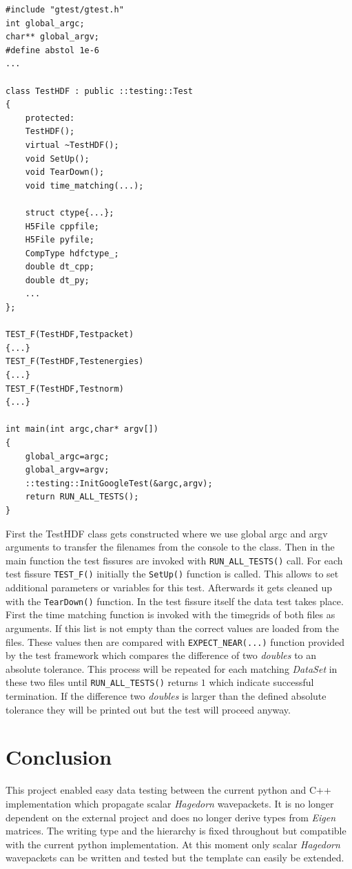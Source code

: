 \begin{lstlisting}
#include "gtest/gtest.h"
int global_argc;
char** global_argv;
#define abstol 1e-6
...

class TestHDF : public ::testing::Test
{
	protected:
	TestHDF();
	virtual ~TestHDF();
	void SetUp();
	void TearDown();
	void time_matching(...);
	
	struct ctype{...};
	H5File cppfile;
	H5File pyfile;
	CompType hdfctype_;
	double dt_cpp;
	double dt_py;
	...
};

TEST_F(TestHDF,Testpacket)
{...}
TEST_F(TestHDF,Testenergies)
{...}
TEST_F(TestHDF,Testnorm)
{...}

int main(int argc,char* argv[])
{
	global_argc=argc;
	global_argv=argv;
	::testing::InitGoogleTest(&argc,argv);
	return RUN_ALL_TESTS();
}
\end{lstlisting}
First the TestHDF class gets constructed where we use global argc and argv arguments to transfer the filenames from the console to the class. Then in the main function the test fissures are invoked with \texttt{RUN\_ALL\_TESTS()} call. For each test fissure \texttt{TEST\_F()} initially the \texttt{SetUp()} function is called. This allows to set additional parameters or variables for this test. Afterwards it gets cleaned up with the \texttt{TearDown()} function. In the test fissure itself the data test takes place. First the time matching function is invoked with the timegrids of both files as arguments. If this list is not empty than the correct values are loaded from the files. These values then are compared with \texttt{EXPECT\_NEAR(...)} function provided by the test framework which compares the difference of two \textit{doubles} to an absolute tolerance. This process will be repeated for each matching \textit{DataSet} in these two files until \texttt{RUN\_ALL\_TESTS()} returns $1$ which indicate successful termination. If the difference two \textit{doubles} is larger than the defined absolute tolerance they will be printed out but the test will proceed anyway.

\chapter{Conclusion}
This project enabled easy data testing between the current python and C++ implementation which propagate scalar \textit{Hagedorn} wavepackets. It is no longer dependent on the external project \cite{eigen3-hdf5} and does no longer derive types from \textit{Eigen} matrices. The writing type and the hierarchy is fixed throughout but compatible with the current python implementation. At this moment only scalar \textit{Hagedorn} wavepackets can be written and tested but the template can easily be extended. 